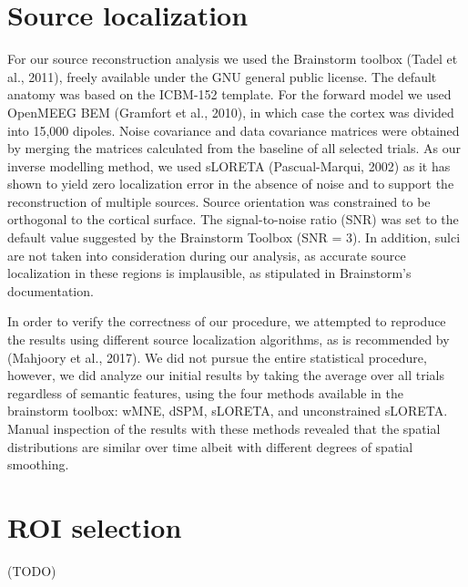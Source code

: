 \section{Source localization}
For our source reconstruction analysis we used the Brainstorm toolbox (Tadel et al., 2011), freely available under the GNU general public license. The default anatomy was based on the ICBM-152 template. For the forward model we used OpenMEEG BEM (Gramfort et al., 2010), in which case the cortex was divided into 15,000 dipoles. Noise covariance and data covariance matrices were obtained by merging the matrices calculated from the baseline of all selected trials. As our inverse modelling method, we used sLORETA (Pascual-Marqui, 2002) as it has shown to yield zero localization error in the absence of noise and to support the reconstruction of multiple sources. Source orientation was constrained to be orthogonal to the cortical surface. The signal-to-noise ratio (SNR) was set to the default value suggested by the Brainstorm Toolbox (SNR = 3). In addition, sulci are not taken into consideration during our analysis, as accurate source localization in these regions is implausible, as stipulated in Brainstorm's documentation.

In order to verify the correctness of our procedure, we attempted to reproduce the results using different source localization algorithms, as is recommended by (Mahjoory et al., 2017). We did not pursue the entire statistical procedure, however, we did analyze our initial results by taking the average over all trials regardless of semantic features, using the four methods available in the brainstorm toolbox: wMNE, dSPM, sLORETA, and unconstrained sLORETA. Manual inspection of the results with these methods revealed that the spatial distributions are similar over time albeit with different degrees of spatial smoothing.

\section{ROI selection}
 
(TODO)